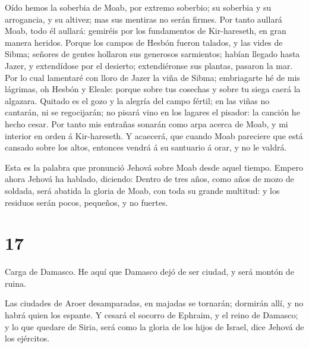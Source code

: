  Oído hemos la soberbia de Moab, por extremo soberbio; su
soberbia y su arrogancia, y su altivez; mas sus mentiras no serán
firmes.  Por tanto aullará Moab, todo él aullará: gemiréis
por los fundamentos de Kir-hareseth, en gran manera heridos.
 Porque los campos de Hesbón fueron talados, y las vides de
Sibma; señores de gentes hollaron sus generosos sarmientos; habían
llegado hasta Jazer, y extendídose por el desierto; extendiéronse sus
plantas, pasaron la mar.  Por lo cual lamentaré con lloro de
Jazer la viña de Sibma; embriagarte hé de mis lágrimas, oh Hesbón y
Eleale: porque sobre tus cosechas y sobre tu siega caerá la algazara.
 Quitado es el gozo y la alegría del campo fértil; en las
viñas no cantarán, ni se regocijarán; no pisará vino en los lagares el
pisador: la canción he hecho cesar.  Por tanto mis entrañas
sonarán como arpa acerca de Moab, y mi interior en orden á Kir-hareseth.
 Y acaecerá, que cuando Moab pareciere que está cansado
sobre los altos, entonces vendrá á su santuario á orar, y no le valdrá.

 Esta es la palabra que pronunció Jehová sobre Moab desde
aquel tiempo.  Empero ahora Jehová ha hablado, diciendo:
Dentro de tres años, como años de mozo de soldada, será abatida la
gloria de Moab, con toda su grande multitud: y los residuos serán pocos,
pequeños, y no fuertes.

\hypertarget{section-16}{%
\section{17}\label{section-16}}

 Carga de Damasco. He aquí que Damasco dejó de ser ciudad, y
será montón de ruina.

 Las ciudades de Aroer desamparadas, en majadas se tornarán;
dormirán allí, y no habrá quien los espante.  Y cesará el
socorro de Ephraim, y el reino de Damasco; y lo que quedare de Siria,
será como la gloria de los hijos de Israel, dice Jehová de los
ejércitos.


